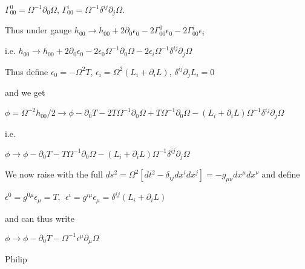 \documentclass[10pt,letterpaper]{article}
\begin{document}
$\Gamma^0_{00}=\Omega^{-1}\partial_0\Omega$, $\Gamma^i_{00}=\Omega^{-1}\delta^{ij}\partial_j\Omega$.


Thus under gauge $h_{00}\rightarrow h_{00} +2\partial_0\epsilon_0-2\Gamma^0_{00}\epsilon_0
-2\Gamma^i_{00}\epsilon_i$


i.e. $h_{00}\rightarrow h_{00} +2\partial_0\epsilon_0-2\epsilon_0\Omega^{-1}\partial_0\Omega
-2\epsilon_i\Omega^{-1}\delta^{ij}\partial_j\Omega$


Thus define $\epsilon_0=-\Omega^2 T$, $\epsilon_i=\Omega^2(L_i+\partial_iL)$, $\delta^{ij}\partial_jL_i=0$


and we get 

$\phi=\Omega^{-2}h_{00}/2\rightarrow \phi -\partial_0T-2T\Omega^{-1}\partial_0\Omega +T\Omega^{-1}\partial_0\Omega-
(L_i+\partial_iL)\Omega^{-1}\delta^{ij}\partial_j\Omega$

i.e.

$\phi\rightarrow \phi -\partial_0T-T\Omega^{-1}\partial_0\Omega -
(L_i+\partial_iL)\Omega^{-1}\delta^{ij}\partial_j\Omega$

We now raise with the full  $ds^2=\Omega^2[dt^2-\delta_{ij}dx^idx^j]=-g_{\mu\nu}dx^{\mu}dx^{\nu}$ and define

$\epsilon^0=g^{0\mu}\epsilon_{\mu}=T,~~ \epsilon^i=g^{i\mu}\epsilon_{\mu}=\delta^{ij}(L_i+\partial_iL)$

and can thus write

$\phi\rightarrow \phi -\partial_0T-\Omega^{-1}\epsilon^{\mu}\partial_{\mu}\Omega$

Philip
\end{document}
